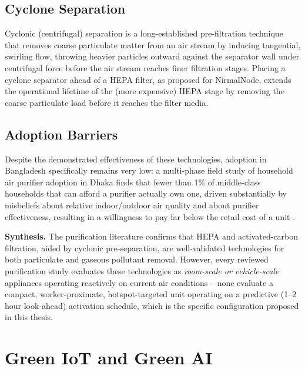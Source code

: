 \subsection{Cyclone Separation}
Cyclonic (centrifugal) separation is a long-established pre-filtration technique that removes coarse particulate matter from an air stream by inducing tangential, swirling flow, throwing heavier particles outward against the separator wall under centrifugal force before the air stream reaches finer filtration stages. Placing a cyclone separator ahead of a HEPA filter, as proposed for NirmalNode, extends the operational lifetime of the (more expensive) HEPA stage by removing the coarse particulate load before it reaches the filter media.

\subsection{Adoption Barriers}
Despite the demonstrated effectiveness of these technologies, adoption in Bangladesh specifically remains very low: a multi-phase field study of household air purifier adoption in Dhaka finds that fewer than 1\% of middle-class households that can afford a purifier actually own one, driven substantially by misbeliefs about relative indoor/outdoor air quality and about purifier effectiveness, resulting in a willingness to pay far below the retail cost of a unit \citep{chowdhury2025misbeliefs}.

\textbf{Synthesis.} The purification literature confirms that HEPA and activated-carbon filtration, aided by cyclonic pre-separation, are well-validated technologies for both particulate and gaseous pollutant removal. However, every reviewed purification study evaluates these technologies as \emph{room-scale or vehicle-scale} appliances operating reactively on current air conditions -- none evaluate a compact, worker-proximate, hotspot-targeted unit operating on a predictive (1--2 hour look-ahead) activation schedule, which is the specific configuration proposed in this thesis.

\section{Green IoT and Green AI}
\label{sec:lr-green}

